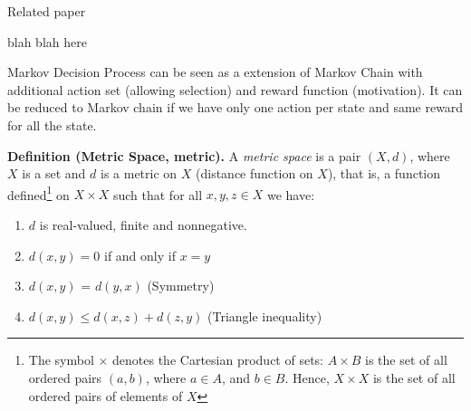 \documentclass[9pt]{article}
\begin{document}
 \Working

Related paper

 \Working

blah blah here

Markov Decision Process can be seen as a extension of Markov Chain with additional action set (allowing selection) and reward function (motivation). It can be reduced to Markov chain if we have only one action per state and same reward for all the state.

 \Working

\textbf{Definition (Metric Space, metric).} A \textit{metric space} is a pair $(X,d)$, where $X$ is a set and $d$ is a metric on $X$ (distance function on $X$), that is, a function defined\footnote[1]{The symbol $\times$ denotes the Cartesian product of sets: $A \times B$ is the set of all ordered pairs $(a,b)$, where $a \in A$, and $b \in B$. Hence, $X \times X$ is the set of all ordered pairs of elements of $X$} on $X \times X$ such that for all $x,y,z \in X$ we have:
\begin{enumerate}
\item $d$ is real-valued, finite and nonnegative.
\item $d(x,y) = 0$ if and only if $x=y$
\item $d(x,y)$ = $d(y,x)$  (Symmetry)
\item $d(x,y) \le d(x,z) + d(z,y)$   (Triangle inequality)
\end{enumerate}
\end{document}
